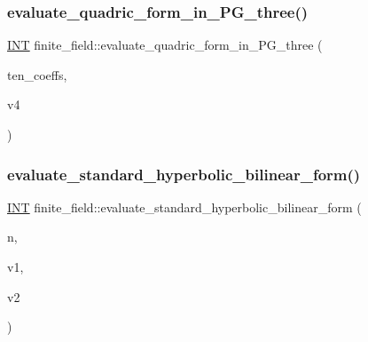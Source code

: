 \subsubsection{\texorpdfstring{evaluate\+\_\+quadric\+\_\+form\+\_\+in\+\_\+\+P\+G\+\_\+three()}{evaluate\_quadric\_form\_in\_PG\_three()}}
{\footnotesize\ttfamily \mbox{\hyperlink{galois_8h_a09fddde158a3a20bd2dcadb609de11dc}{I\+NT}} finite\+\_\+field\+::evaluate\+\_\+quadric\+\_\+form\+\_\+in\+\_\+\+P\+G\+\_\+three (\begin{DoxyParamCaption}\item[{\mbox{\hyperlink{galois_8h_a09fddde158a3a20bd2dcadb609de11dc}{I\+NT}} $\ast$}]{ten\+\_\+coeffs,  }\item[{\mbox{\hyperlink{galois_8h_a09fddde158a3a20bd2dcadb609de11dc}{I\+NT}} $\ast$}]{v4 }\end{DoxyParamCaption})}

\mbox{\label{classfinite__field_a86702e568b656f5d2d5862db184e52c2}} 
\subsubsection{\texorpdfstring{evaluate\+\_\+standard\+\_\+hyperbolic\+\_\+bilinear\+\_\+form()}{evaluate\_standard\_hyperbolic\_bilinear\_form()}}
{\footnotesize\ttfamily \mbox{\hyperlink{galois_8h_a09fddde158a3a20bd2dcadb609de11dc}{I\+NT}} finite\+\_\+field\+::evaluate\+\_\+standard\+\_\+hyperbolic\+\_\+bilinear\+\_\+form (\begin{DoxyParamCaption}\item[{\mbox{\hyperlink{galois_8h_a09fddde158a3a20bd2dcadb609de11dc}{I\+NT}}}]{n,  }\item[{\mbox{\hyperlink{galois_8h_a09fddde158a3a20bd2dcadb609de11dc}{I\+NT}} $\ast$}]{v1,  }\item[{\mbox{\hyperlink{galois_8h_a09fddde158a3a20bd2dcadb609de11dc}{I\+NT}} $\ast$}]{v2 }\end{DoxyParamCaption})}

\mbox{\label{classfinite__field_a7c9ab3dab0442ce9dbb65e955ef267ad}} 
